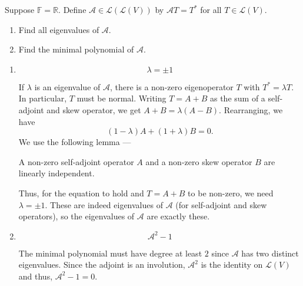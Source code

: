\documentclass[12 pt, letterpaper]{hmcpset}
\begin{document}
\pagebreak

\begin{problem}[13]
	Suppose $\mathbb{F} = \mathbb{R}$. Define $\mathcal{A} \in \mathcal{L}(\mathcal{L}(V))$ by $\mathcal{A} T = T^{*}$ for all $T \in \mathcal{L}(V)$.
	\begin{enumerate}
		\item Find all eigenvalues of $\mathcal{A}$.
		\item Find the minimal polynomial of $\mathcal{A}$.
	\end{enumerate}
\end{problem}

\begin{solution}
	\begin{enumerate}
		\item
			\[
				\boxed{
					\lambda = \pm 1
				}
			\]

			If $\lambda$ is an eigenvalue of $\mathcal{A}$, there is a non-zero eigenoperator $T$ with $T^{*} = \lambda T$. In particular, $T$ must be normal. Writing $T = A + B$ as the sum of a self-adjoint and skew operator, we get $A + B = \lambda(A - B)$. Rearranging, we have
			\[
				(1 - \lambda) A + (1 + \lambda) B = 0.
			\]
			We use the following lemma ---
			\begin{lemma}
				A non-zero self-adjoint operator $A$ and a non-zero skew operator $B$ are linearly independent.
			\end{lemma}

			Thus, for the equation to hold and $T = A + B$ to be non-zero, we need $\lambda = \pm 1$. These are indeed eigenvalues of $\mathcal{A}$ (for self-adjoint and skew operators), so the eigenvalues of $\mathcal{A}$ are exactly these.
		\item
			\[
				\boxed{
					\mathcal{A}^{2} - 1
				}
			\]

			The minimal polynomial must have degree at least $2$ since $\mathcal{A}$ has two distinct eigenvalues. Since the adjoint is an involution, $\mathcal{A}^{2}$ is the identity on $\mathcal{L}(V)$ and thus, $\mathcal{A}^{2} - 1 = 0$.
	\end{enumerate}
\end{solution}

\pagebreak
\end{document}
